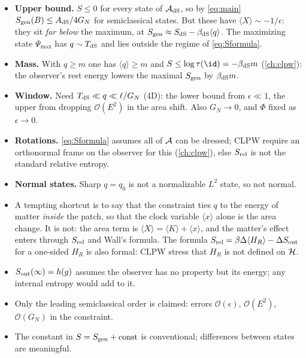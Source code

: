 \begin{itemize}
\item \textbf{Upper bound.} $S\le0$ for every state of $\mathcal{A}_{\rm dS}$, so by \eqref{eq:main} $S_{\mathrm{gen}}(B)\le A_{\rm dS}/4G_N$ for semiclassical states. But these have $\langle X\rangle\sim-1/\epsilon$: they sit \emph{far below} the maximum, at $S_{\mathrm{gen}}\approx S_{\rm dS}-\beta_{\rm dS}\langle q\rangle$. The maximizing state $\Psi_{\max}$ has $q\sim T_{\rm dS}$ and lies outside the regime of \eqref{eq:Sformula}.
\item \textbf{Mass.} With $q\ge m$ one has $\langle q\rangle\ge m$ and $S\le\log\tau(\id)=-\beta_{\rm dS}m$ (\cref{ch:clpw}): the observer's rest energy lowers the maximal $S_{\mathrm{gen}}$ by $\beta_{\rm dS}m$.
\item \textbf{Window.} Need $T_{\rm dS}\ll q\ll\ell/G_N$ (4D): the lower bound from $\epsilon\ll1$, the upper from dropping $\mathcal O(E^2)$ in the area shift. Also $G_N\to0$, and $\Phi$ fixed as $\epsilon\to0$.
\item \textbf{Rotations.} \eqref{eq:Sformula} assumes all of $\mathcal{A}$ can be dressed; CLPW require an orthonormal frame on the observer for this (\cref{ch:clpw}), else $S_{\rm rel}$ is not the standard relative entropy.
\item \textbf{Normal states.} Sharp $q=q_0$ is not a normalizable $L^2$ state, so not normal.
\end{itemize}

\begin{whatwrong}
\begin{itemize}
\item A tempting shortcut is to say that the constraint ties $q$ to the energy of matter \emph{inside} the patch, so that the clock variable $\langle x\rangle$ alone is the area change. It is not: the area term is $\langle X\rangle=\langle K\rangle+\langle x\rangle$, and the matter's effect enters through $S_{\rm rel}$ and Wall's formula. The formula $S_{\rm rel}=\beta\Delta\langle H_R\rangle-\Delta S_{\rm out}$ for a one-sided $H_R$ is also formal: CLPW stress that $H_R$ is not defined on $\mathcal{H}$.
\item $S_{\rm out}(\infty)=h(g)$ assumes the observer has no property but its energy; any internal entropy would add to it.
\item Only the leading semiclassical order is claimed: errors $\mathcal O(\epsilon)$, $\mathcal O(E^2)$, $\mathcal O(G_N)$ in the constraint.
\item The constant in $S=S_{\mathrm{gen}}+\text{const}$ is conventional; differences between states are meaningful.
\end{itemize}
\end{whatwrong}

